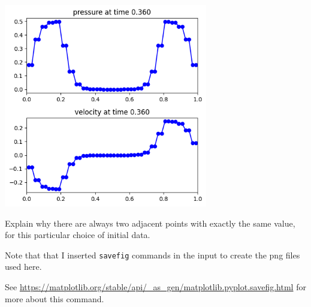 \documentclass[11pt]{article}
\begin{document}
\vskip 10pt
\hfil\includegraphics[width=3.5in]{plot2.png}\hfil

Explain why there are always two adjacent points with exactly the same
value, for this particular choice of initial data.

\vskip 10pt
Note that that I inserted {\tt savefig} commands in the input to create the
png files used here.

See \url{https://matplotlib.org/stable/api/_as_gen/matplotlib.pyplot.savefig.html}
for more about this command.


\end{document}
